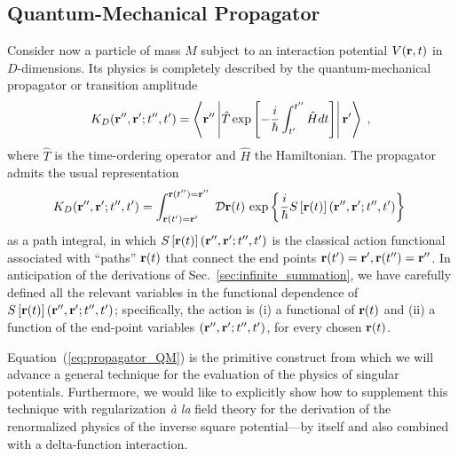 \documentclass[a4paper,preprint,draft,showpacs,amsmath,amsfonts,amssymb,aps,prd]{revtex4}%
\begin{document}
\subsection{Quantum-Mechanical Propagator}
\label{sec:QM_propagator}


Consider now a particle of mass $M$ 
subject to an interaction potential $V({\bf r},t)$ in  $D$-dimensions.
Its physics is completely described
by the quantum-mechanical propagator or transition amplitude
\begin{equation} 
 K_{D}  ( {\bf r}'', {\bf r}' ; t'',t' ) 
=
\left\langle 
{\bf r}''
\left| 
\hat{T}
\exp \left[
 -\frac{i}{\hbar} \int_{t'}^{t''}
\hat{H} dt 
\right]
\right|
{\bf r}'
 \right\rangle   
\; ,
\label{eq:propagator_QM_from_evolution_operator}
\end{equation}
where $\hat{T}$ is the time-ordering operator
and  $\hat{H}$ the Hamiltonian.
The propagator
admits the usual representation
\begin{equation}
K_{D}({\bf r}'', {\bf r}' ; t'',t') 
= 
\int_{  {\bf r} (t')  = {\bf r}'  }^{  {\bf r} (t'')  = {\bf r}'' }
 \;  
{\cal D} {\bf r} (t) \,
\exp \left\{ 
\frac{i}{\hbar} 
S \left[ {\bf r}(t)  \right]  ({\bf r}'', {\bf r}' ; t'',t')  
\right\}
\;  
\label{eq:propagator_QM}
\end{equation}
as a path integral, in which 
$S \left[ {\bf r}(t)  \right]  ({\bf r}'', {\bf r}' ; t'',t')  $ 
is the classical action functional
associated with ``paths''
$ {\bf r}(t)  $ that connect the end points
${\bf r} (t')  = {\bf r}',  {\bf r} (t'')  = {\bf r}'' $.
In anticipation of the derivations of Sec.~\ref{sec:infinite_summation},
we have carefully defined all the relevant variables in the functional dependence 
of 
$S \left[ {\bf r}(t)  \right]  ({\bf r}'', {\bf r}' ; t'',t')  $; specifically, 
the action is 
(i) a functional of 
$ {\bf r}(t)  $ and
(ii) a function of the end-point variables
$({\bf r}'', {\bf r}' ; t'',t')  $, 
for every chosen
$ {\bf r}(t)  $.

Equation~(\ref{eq:propagator_QM}) is
the primitive construct 
from which we will advance a general technique for the evaluation of the physics
of singular potentials. 
Furthermore,
we would like to explicitly show how to supplement this technique with regularization
{\it \`{a} la\/} field theory
for the derivation of the renormalized physics of the inverse square
potential---by itself and also combined with a delta-function interaction.
\end{document}

